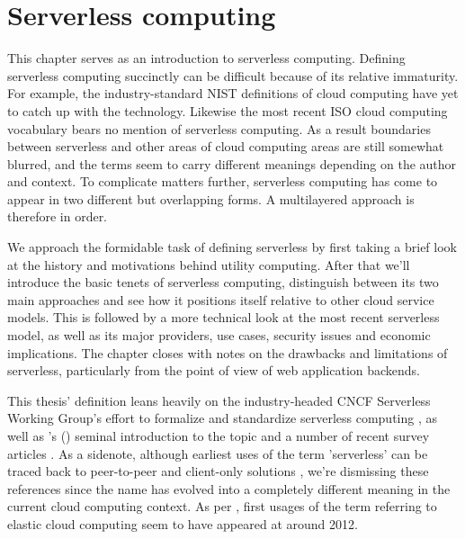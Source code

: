 \chapter{Serverless computing} \label{cha:serverless}

This chapter serves as an introduction to serverless computing. Defining serverless computing succinctly can be difficult because of its relative immaturity. For example, the industry-standard NIST definitions of cloud computing \parencite{nist11definitions} have yet to catch up with the technology. Likewise the most recent ISO cloud computing vocabulary \parencite{iso14vocabulary} bears no mention of serverless computing. As a result boundaries between serverless and other areas of cloud computing areas are still somewhat blurred, and the terms seem to carry different meanings depending on the author and context. To complicate matters further, serverless computing has come to appear in two different but overlapping forms. A multilayered approach is therefore in order.

We approach the formidable task of defining serverless by first taking a brief look at the history and motivations behind utility computing. After that we'll introduce the basic tenets of serverless computing, distinguish between its two main approaches and see how it positions itself relative to other cloud service models. This is followed by a more technical look at the most recent serverless model, as well as its major providers, use cases, security issues and economic implications. The chapter closes with notes on the drawbacks and limitations of serverless, particularly from the point of view of web application backends.

This thesis' definition leans heavily on the industry-headed CNCF Serverless Working Group's effort to formalize and standardize serverless computing \parencite{cncf18serverlessWG}, as well as \citeauthor{robert2016serverlessarchitectures}'s (\citeyear{robert2016serverlessarchitectures}) seminal introduction to the topic and a number of recent survey articles \parencite[e.g.][]{baldini17currentTrends,van2017spec,fox17}. As a sidenote, although earliest uses of the term 'serverless' can be traced back to peer-to-peer and client-only solutions \parencite{fox17}, we're dismissing these references since the name has evolved into a completely different meaning in the current cloud computing context. As per \textcite{robert2016serverlessarchitectures}, first usages of the term referring to elastic cloud computing seem to have appeared at around 2012.

